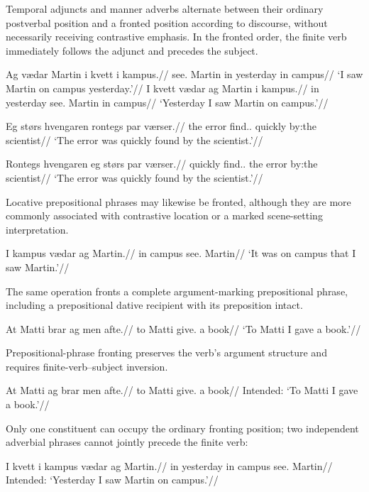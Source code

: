 Temporal adjuncts and manner adverbs alternate between their ordinary postverbal position and a fronted position according to discourse, without necessarily receiving contrastive emphasis. In the fronted order, the finite verb immediately follows the adjunct and precedes the subject.

\pex
\begingl
\gla Ag vædar Martin i kvett i kampus.//
\glb \First{}\Sg{} see.\Pst{} Martin in yesterday in campus//
\glft `I saw Martin on campus yesterday.'//
\endgl
\xe
\pex
\begingl
\gla I kvett vædar ag Martin i kampus.//
\glb in yesterday see.\Pst{} \First{}\Sg{} Martin in campus//
\glft `Yesterday I saw Martin on campus.'//
\endgl
\xe

\pex
\begingl
\gla Eg størs hvengaren rontegs par værser.//
\glb the error find.\Pst{}.\Pass{} quickly by:the scientist//
\glft `The error was quickly found by the scientist.'//
\endgl
\xe

\pex
\begingl
\gla Rontegs hvengaren eg størs par værser.//
\glb quickly find.\Pst{}.\Pass{} the error by:the scientist//
\glft `The error was quickly found by the scientist.'//
\endgl
\xe

Locative prepositional phrases may likewise be fronted,
although they are more commonly associated with contrastive
location or a marked scene-setting interpretation.

\pex
\begingl
\gla I kampus vædar ag Martin.//
\glb in campus see.\Pst{} \First{}\Sg{} Martin//
\glft `It was on campus that I saw Martin.'//
\endgl
\xe

The same operation fronts a complete argument-marking prepositional phrase, including a prepositional dative recipient with its preposition intact.

\pex
\begingl
\gla At Matti brar ag men afte.//
\glb to Matti give.\Pst{} \First{}\Sg{} a book//
\glft `To Matti I gave a book.'//
\endgl
\xe

Prepositional-phrase fronting preserves the verb's argument structure and requires finite-verb--subject inversion.

\pex
\begingl
\gla *At Matti ag brar men afte.//
\glb to Matti \First{}\Sg{} give.\Pst{} a book//
\glft Intended: `To Matti I gave a book.'//
\endgl
\xe

Only one constituent can occupy the ordinary fronting position; two independent adverbial phrases cannot jointly precede the finite verb:

\pex
\begingl
\gla *I kvett i kampus vædar ag Martin.//
\glb in yesterday in campus see.\Pst{} \First{}\Sg{} Martin//
\glft Intended: `Yesterday I saw Martin on campus.'//
\endgl
\xe

